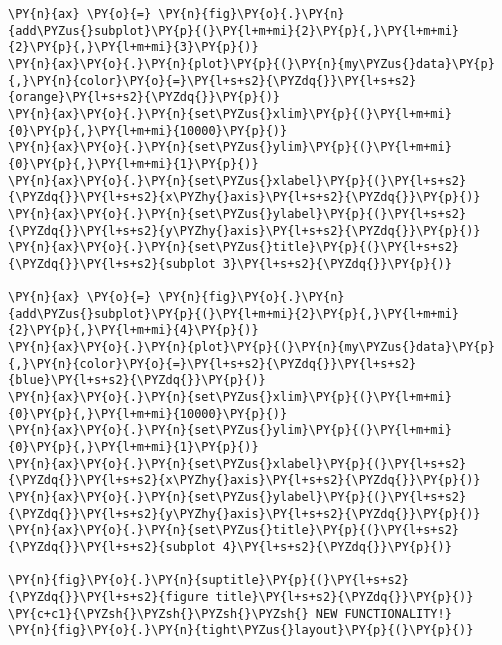 \begin{tcolorbox}[breakable, size=fbox, boxrule=1pt, pad at break*=1mm,colback=cellbackground, colframe=cellborder]
\begin{Verbatim}[commandchars=\\\{\}]
\PY{n}{ax} \PY{o}{=} \PY{n}{fig}\PY{o}{.}\PY{n}{add\PYZus{}subplot}\PY{p}{(}\PY{l+m+mi}{2}\PY{p}{,}\PY{l+m+mi}{2}\PY{p}{,}\PY{l+m+mi}{3}\PY{p}{)}
\PY{n}{ax}\PY{o}{.}\PY{n}{plot}\PY{p}{(}\PY{n}{my\PYZus{}data}\PY{p}{,}\PY{n}{color}\PY{o}{=}\PY{l+s+s2}{\PYZdq{}}\PY{l+s+s2}{orange}\PY{l+s+s2}{\PYZdq{}}\PY{p}{)}
\PY{n}{ax}\PY{o}{.}\PY{n}{set\PYZus{}xlim}\PY{p}{(}\PY{l+m+mi}{0}\PY{p}{,}\PY{l+m+mi}{10000}\PY{p}{)}
\PY{n}{ax}\PY{o}{.}\PY{n}{set\PYZus{}ylim}\PY{p}{(}\PY{l+m+mi}{0}\PY{p}{,}\PY{l+m+mi}{1}\PY{p}{)}
\PY{n}{ax}\PY{o}{.}\PY{n}{set\PYZus{}xlabel}\PY{p}{(}\PY{l+s+s2}{\PYZdq{}}\PY{l+s+s2}{x\PYZhy{}axis}\PY{l+s+s2}{\PYZdq{}}\PY{p}{)}
\PY{n}{ax}\PY{o}{.}\PY{n}{set\PYZus{}ylabel}\PY{p}{(}\PY{l+s+s2}{\PYZdq{}}\PY{l+s+s2}{y\PYZhy{}axis}\PY{l+s+s2}{\PYZdq{}}\PY{p}{)}
\PY{n}{ax}\PY{o}{.}\PY{n}{set\PYZus{}title}\PY{p}{(}\PY{l+s+s2}{\PYZdq{}}\PY{l+s+s2}{subplot 3}\PY{l+s+s2}{\PYZdq{}}\PY{p}{)}

\PY{n}{ax} \PY{o}{=} \PY{n}{fig}\PY{o}{.}\PY{n}{add\PYZus{}subplot}\PY{p}{(}\PY{l+m+mi}{2}\PY{p}{,}\PY{l+m+mi}{2}\PY{p}{,}\PY{l+m+mi}{4}\PY{p}{)}
\PY{n}{ax}\PY{o}{.}\PY{n}{plot}\PY{p}{(}\PY{n}{my\PYZus{}data}\PY{p}{,}\PY{n}{color}\PY{o}{=}\PY{l+s+s2}{\PYZdq{}}\PY{l+s+s2}{blue}\PY{l+s+s2}{\PYZdq{}}\PY{p}{)}
\PY{n}{ax}\PY{o}{.}\PY{n}{set\PYZus{}xlim}\PY{p}{(}\PY{l+m+mi}{0}\PY{p}{,}\PY{l+m+mi}{10000}\PY{p}{)}
\PY{n}{ax}\PY{o}{.}\PY{n}{set\PYZus{}ylim}\PY{p}{(}\PY{l+m+mi}{0}\PY{p}{,}\PY{l+m+mi}{1}\PY{p}{)}
\PY{n}{ax}\PY{o}{.}\PY{n}{set\PYZus{}xlabel}\PY{p}{(}\PY{l+s+s2}{\PYZdq{}}\PY{l+s+s2}{x\PYZhy{}axis}\PY{l+s+s2}{\PYZdq{}}\PY{p}{)}
\PY{n}{ax}\PY{o}{.}\PY{n}{set\PYZus{}ylabel}\PY{p}{(}\PY{l+s+s2}{\PYZdq{}}\PY{l+s+s2}{y\PYZhy{}axis}\PY{l+s+s2}{\PYZdq{}}\PY{p}{)}
\PY{n}{ax}\PY{o}{.}\PY{n}{set\PYZus{}title}\PY{p}{(}\PY{l+s+s2}{\PYZdq{}}\PY{l+s+s2}{subplot 4}\PY{l+s+s2}{\PYZdq{}}\PY{p}{)}

\PY{n}{fig}\PY{o}{.}\PY{n}{suptitle}\PY{p}{(}\PY{l+s+s2}{\PYZdq{}}\PY{l+s+s2}{figure title}\PY{l+s+s2}{\PYZdq{}}\PY{p}{)}
\PY{c+c1}{\PYZsh{}\PYZsh{}\PYZsh{}\PYZsh{} NEW FUNCTIONALITY!}
\PY{n}{fig}\PY{o}{.}\PY{n}{tight\PYZus{}layout}\PY{p}{(}\PY{p}{)}
\end{Verbatim}
\end{tcolorbox}

    \begin{center}
    \end{center}
    { \hspace*{\fill} \\}
    
